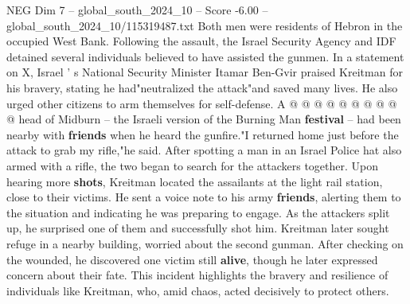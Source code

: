 \begin{textsample}{NEG Dim 7 – global\_south\_2024\_10 – Score -6.00 – global\_south\_2024\_10/115319487.txt}
Both men were residents of Hebron in the occupied West Bank.
Following the assault, the Israel Security Agency and IDF detained several individuals believed to have assisted the gunmen.
In a statement on X, Israel ' s National Security Minister Itamar Ben-Gvir praised Kreitman for his bravery, stating he had"neutralized the attack"and saved many lives.
He also urged other citizens to arm themselves for self-defense.
A @ @ @ @ @ @ @ @ @ @ head of Midburn -- the Israeli version of the Burning Man \textbf{festival} -- had been nearby with \textbf{friends} when he heard the gunfire."I returned home just before the attack to grab my rifle,"he said.
After spotting a man in an Israel Police hat also armed with a rifle, the two began to search for the attackers together.
Upon hearing more \textbf{shots}, Kreitman located the assailants at the light rail station, close to their victims.
He sent a voice note to his army \textbf{friends}, alerting them to the situation and indicating he was preparing to engage.
As the attackers split up, he surprised one of them and successfully shot him.
Kreitman later sought refuge in a nearby building, worried about the second gunman.
After checking on the wounded, he discovered one victim still \textbf{alive}, though he later expressed concern about their fate.
This incident highlights the bravery and resilience of individuals like Kreitman, who, amid chaos, acted decisively to protect others.

\end{textsample}
